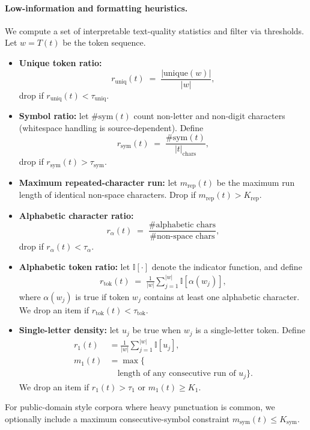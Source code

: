 \documentclass[11pt]{article}
\begin{document}
\paragraph{Low-information and formatting heuristics.}
We compute a set of interpretable text-quality statistics and filter via thresholds. Let $w=T(t)$ be the token sequence.
\begin{itemize}
  \item \textbf{Unique token ratio:}
  \[
  r_{\text{uniq}}(t) \;=\; \frac{\lvert \text{unique}(w)\rvert}{\lvert w\rvert},
  \]
  drop if $r_{\text{uniq}}(t) < \tau_{\text{uniq}}$.

  \item \textbf{Symbol ratio:} let $\#\text{sym}(t)$ count non-letter and non-digit characters (whitespace handling is source-dependent). Define
  \[
  r_{\text{sym}}(t) \;=\; \frac{\#\text{sym}(t)}{\lvert t\rvert_{\text{chars}}},
  \]
  drop if $r_{\text{sym}}(t) > \tau_{\text{sym}}$.

  \item \textbf{Maximum repeated-character run:} let $m_{\text{rep}}(t)$ be the maximum run length of identical non-space characters. Drop if $m_{\text{rep}}(t) > K_{\text{rep}}$.

  \item \textbf{Alphabetic character ratio:}
  \[
  r_{\alpha}(t) \;=\; \frac{\#\text{alphabetic chars}}{\#\text{non-space chars}},
  \]
  drop if $r_{\alpha}(t) < \tau_{\alpha}$.

    \item \textbf{Alphabetic token ratio:}
    let $\mathbb{I}[\cdot]$ denote the indicator function, and define
    \[
    \begin{aligned}
    \label{eq:alpha-token-ratio}
    r_{\text{tok}}(t)
    \;=\;
    \frac{1}{\lvert w\rvert}
    \sum_{j=1}^{\lvert w\rvert}
    \mathbb{I}\!\left[\alpha(w_j)\right],
    \end{aligned}
    \]
    where $\alpha(w_j)$ is true if token $w_j$ contains at least one alphabetic character.
    We drop an item if $r_{\text{tok}}(t) < \tau_{\text{tok}}$.


    \item \textbf{Single-letter density:}
    let $u_j$ be true when $w_j$ is a single-letter token. Define
    \[
    \begin{aligned}
    r_{1}(t)
    &=\frac{1}{\lvert w\rvert}
    \sum_{j=1}^{\lvert w\rvert}\mathbb{I}[u_j], \\
    m_{1}(t)
    &=\max \{ \\
    &\quad \text{length of any consecutive run of } u_j
    \}.
    \end{aligned}
    \]
    We drop an item if $r_{1}(t) > \tau_{1}$ or $m_{1}(t) \ge K_{1}$.


\end{itemize}
For public-domain style corpora where heavy punctuation is common, we optionally include a maximum consecutive-symbol constraint $m_{\text{sym}}(t) \le K_{\text{sym}}$.
\end{document}
